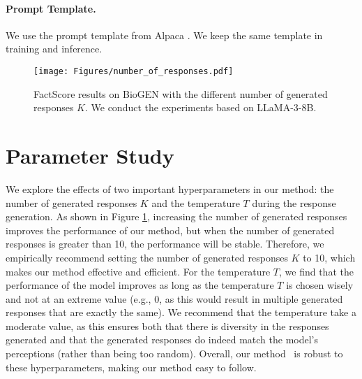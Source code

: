 \paragraph{Prompt Template.}
We use the prompt template from Alpaca \citep{alpaca}.
We keep the same template in training and inference.



\begin{figure}
    \centering
    \texttt{[image: Figures/number\_of\_responses.pdf]}
    \caption{FactScore results on BioGEN with the different number of generated responses $K$. We conduct the experiments based on LLaMA-3-8B. }
    \label{fig_k}
\end{figure}



\section{Parameter Study}
\label{appendix:para}
We explore the effects of two important hyperparameters in our method: the number of generated responses $K$ and the temperature $T$ during the response generation.
As shown in Figure \ref{fig_k}, increasing the number of generated responses improves the performance of our method, but when the number of generated responses is greater than 10, the performance will be stable.
Therefore, we empirically recommend setting the number of generated responses $K$ to 10, which makes our method effective and efficient.
For the temperature $T$, we find that the performance of the model improves as long as the temperature $T$ is chosen wisely and not at an extreme value (e.g., 0, as this would result in multiple generated responses that are exactly the same).
We recommend that the temperature take a moderate value, as this ensures both that there is diversity in the responses generated and that the generated responses do indeed match the model's perceptions (rather than being too random).
Overall, our method \OURS~is robust to these hyperparameters, making our method easy to follow.

